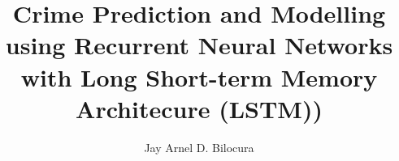 \title{Crime Prediction and Modelling using Recurrent Neural Networks with Long Short-term Memory Architecure (LSTM))}

\author{Jay Arnel D. Bilocura}



\renewcommand{\submissiontext}{This special problem is submitted for the degree of}



\subject{LaTeX} 
